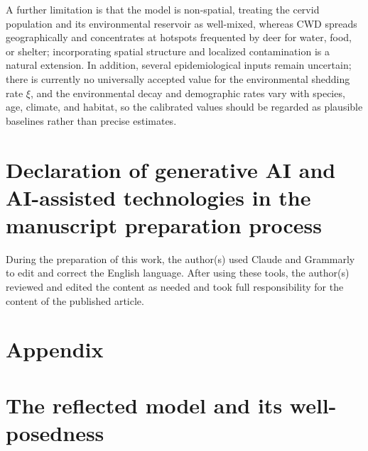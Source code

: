 \documentclass[12pt,a4paper,reqno]{amsart}
\theoremstyle{definition}
\theoremstyle{remark}
\theoremstyle{plain}
\begin{document}
A further limitation is that the model is non-spatial, treating the cervid population and its environmental reservoir as well-mixed, whereas CWD spreads geographically and concentrates at hotspots frequented by deer for water, food, or shelter; incorporating spatial structure and localized contamination is a natural extension. In addition, several epidemiological inputs remain uncertain; there is currently no universally accepted value for the environmental shedding rate $\xi$, and the environmental decay and demographic rates vary with species, age, climate, and habitat, so the calibrated values should be regarded as plausible baselines rather than precise estimates.

\section*{Declaration of generative AI and AI-assisted technologies in the manuscript preparation process}
During the preparation of this work, the author(s) used Claude and Grammarly to edit and correct the English language. After using these tools, the author(s) reviewed and edited the content as needed and took full responsibility for the content of the published article.
\newpage
\appendix
\section*{Appendix}
\section{The reflected model and its well-posedness}
\label{sec:reflected}
\end{document}
